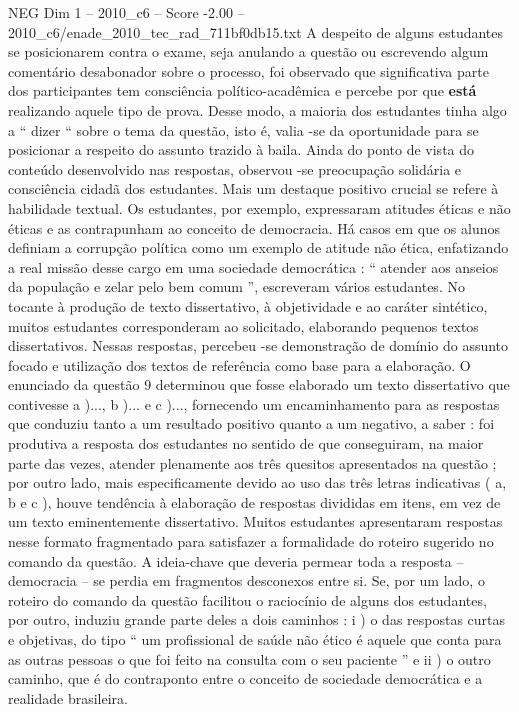 \begin{textsample}{NEG Dim 1 – 2010\_c6 – Score -2.00 – 2010\_c6/enade\_2010\_tec\_rad\_711bf0db15.txt}
A despeito de alguns estudantes se posicionarem contra o exame, seja anulando a questão ou escrevendo algum comentário desabonador sobre o processo, foi observado que significativa parte dos participantes tem consciência político-acadêmica e percebe por que \textbf{está} realizando aquele tipo de prova.
Desse modo, a maioria dos estudantes tinha algo a “ dizer “ sobre o tema da questão, isto é, valia -se da oportunidade para se posicionar a respeito do assunto trazido à baila.
Ainda do ponto de vista do conteúdo desenvolvido nas respostas, observou -se preocupação solidária e consciência cidadã dos estudantes.
Mais um destaque positivo crucial se refere à habilidade textual.
Os estudantes, por exemplo, expressaram atitudes éticas e não éticas e as contrapunham ao conceito de democracia.
Há casos em que os alunos definiam a corrupção política como um exemplo de atitude não ética, enfatizando a real missão desse cargo em uma sociedade democrática : “ atender aos anseios da população e zelar pelo bem comum ”, escreveram vários estudantes.
No tocante à produção de texto dissertativo, à objetividade e ao caráter sintético, muitos estudantes corresponderam ao solicitado, elaborando pequenos textos dissertativos.
Nessas respostas, percebeu -se demonstração de domínio do assunto focado e utilização dos textos de referência como base para a elaboração.
O enunciado da questão 9 determinou que fosse elaborado um texto dissertativo que contivesse a )..., b )... e c )..., fornecendo um encaminhamento para as respostas que conduziu tanto a um resultado positivo quanto a um negativo, a saber : foi produtiva a resposta dos estudantes no sentido de que conseguiram, na maior parte das vezes, atender plenamente aos três quesitos apresentados na questão ; por outro lado, mais especificamente devido ao uso das três letras indicativas ( a, b e c ), houve tendência à elaboração de respostas divididas em itens, em vez de um texto eminentemente dissertativo.
Muitos estudantes apresentaram respostas nesse formato fragmentado para satisfazer a formalidade do roteiro sugerido no comando da questão.
A ideia-chave que deveria permear toda a resposta – democracia – se perdia em fragmentos desconexos entre si.
Se, por um lado, o roteiro do comando da questão facilitou o raciocínio de alguns dos estudantes, por outro, induziu grande parte deles a dois caminhos : i ) o das respostas curtas e objetivas, do tipo “ um profissional de saúde não ético é aquele que conta para as outras pessoas o que foi feito na consulta com o seu paciente ” e ii ) o outro caminho, que é do contraponto entre o conceito de sociedade democrática e a realidade brasileira.

\end{textsample}
